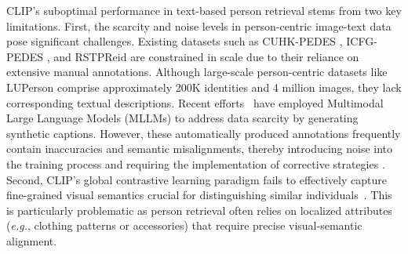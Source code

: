 CLIP's suboptimal performance in text-based person retrieval stems from two key limitations. First, the scarcity and noise levels in person-centric image-text data pose significant challenges. Existing datasets such as CUHK-PEDES \cite{li2017person}, ICFG-PEDES \cite{ding2021semantically}, and RSTPReid \cite{zhu2021dssl} are constrained in scale due to their reliance on extensive manual annotations. Although large-scale person-centric datasets like LUPerson \cite{fu2021unsupervised} comprise approximately 200K identities and 4 million images, they lack corresponding textual descriptions. Recent efforts~\cite{tan2024harnessing} have employed Multimodal Large Language Models (MLLMs) to address data scarcity by generating synthetic captions. However, these automatically produced annotations frequently contain inaccuracies and semantic misalignments, thereby introducing noise into the training process and requiring the implementation of corrective strategies \cite{zhao2024genixer}. Second, CLIP's global contrastive learning paradigm fails to effectively capture fine-grained visual semantics crucial for distinguishing similar individuals~\cite{yan2023clip, liu2024distilling}. This is particularly problematic as person retrieval often relies on localized attributes (\textit{e.g.}, clothing patterns or accessories) that require precise visual-semantic alignment.

